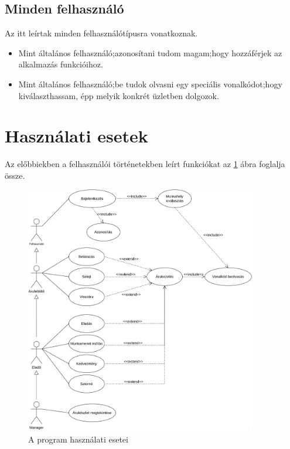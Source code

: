 \documentclass[12pt,a4paper]{article}
\begin{document}
	\subsection{Minden felhasználó}
	Az itt leírtak minden felhasználótípusra vonatkoznak.
	\begin{itemize}
		\item Mint általános felhasználó;\newline azonosítani tudom magam;\newline hogy hozzáférjek az alkalmazás funkcióihoz.
		\item Mint általános felhasználó;\newline be tudok olvasni egy speciális vonalkódot;\newline hogy kiválaszthassam, épp melyik konkrét üzletben dolgozok.
	\end{itemize}
	
	\section{Használati esetek}
	Az előbbiekben a felhasználói történetekben leírt funkciókat az \ref{fig:usecase} ábra  foglalja össze.
	\begin{figure}[H]
		\centering
		\includegraphics[width=0.9\textwidth]{img/usecases.pdf}
		\caption{A program használati esetei}
		\label{fig:usecase}
	\end{figure}
	
\end{document}
